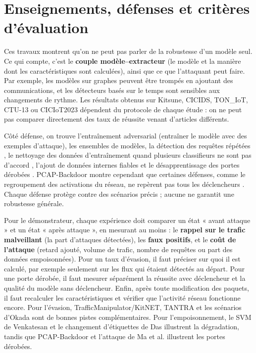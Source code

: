 \documentclass[a4paper,10pt]{article}
\begin{document}
\section{Enseignements, défenses et critères d'évaluation}
Ces travaux montrent qu'on ne peut pas parler de la robustesse d'un modèle
seul. Ce qui compte, c'est le \textbf{couple modèle--extracteur} (le modèle et
la manière dont les caractéristiques sont calculées), ainsi que ce que
l'attaquant peut faire. Par exemple, les modèles sur graphes peuvent être
trompés en ajoutant des communications, et les détecteurs basés sur le temps
sont sensibles aux changements de rythme. Les résultats obtenus sur Kitsune,
CICIDS, TON\_IoT, CTU-13 ou CICIoT2023 dépendent du protocole de chaque étude :
on ne peut pas comparer directement des taux de réussite venant d'articles
différents.

Côté défense, on trouve l'entraînement adversarial (entraîner le modèle avec
des exemples d'attaque), les ensembles de modèles, la détection des requêtes
répétées \cite{han,zhang}, le nettoyage des données d'entraînement quand
plusieurs classifieurs ne sont pas d'accord \cite{venkatesan}, l'ajout de
données internes fiables \cite{alhussien} et le désapprentissage des portes
dérobées \cite{ma}. PCAP-Backdoor montre cependant que certaines défenses,
comme le regroupement des activations du réseau, ne repèrent pas tous les
déclencheurs \cite{backdoor}. Chaque défense protège contre des scénarios
précis ; aucune ne garantit une robustesse générale.

Pour le démonstrateur, chaque expérience doit comparer un état « avant
attaque » et un état « après attaque », en mesurant au moins : le
\textbf{rappel sur le trafic malveillant} (la part d'attaques détectées), les
\textbf{faux positifs}, et le \textbf{coût de l'attaque} (retard ajouté,
volume de trafic, nombre de requêtes ou part des données empoisonnées). Pour
un taux d'évasion, il faut préciser sur quoi il est calculé, par exemple
seulement sur les flux qui étaient détectés au départ. Pour une porte dérobée,
il faut mesurer séparément la réussite avec déclencheur et la qualité du
modèle sans déclencheur. Enfin, après toute modification des paquets, il faut
recalculer les caractéristiques et vérifier que l'activité réseau fonctionne
encore. Pour l'évasion, TrafficManipulator/KitNET, TANTRA et les scénarios
d'Okada sont de bonnes pistes complémentaires. Pour l'empoisonnement, le SVM de
Venkatesan et le changement d'étiquettes de Das illustrent la dégradation,
tandis que PCAP-Backdoor et l'attaque de Ma et al. illustrent les portes
dérobées.
\end{document}
